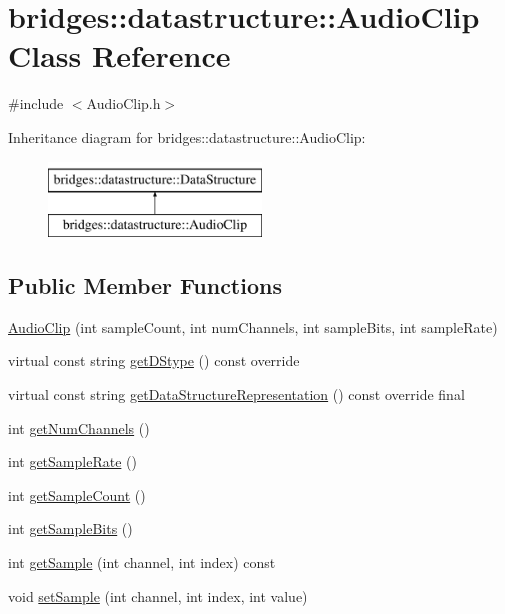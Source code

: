 \hypertarget{classbridges_1_1datastructure_1_1_audio_clip}{}\section{bridges\+:\+:datastructure\+:\+:Audio\+Clip Class Reference}
\label{classbridges_1_1datastructure_1_1_audio_clip}


{\ttfamily \#include $<$Audio\+Clip.\+h$>$}

Inheritance diagram for bridges\+:\+:datastructure\+:\+:Audio\+Clip\+:\begin{figure}[H]
\begin{center}
\leavevmode
\includegraphics[height=2.000000cm]{classbridges_1_1datastructure_1_1_audio_clip}
\end{center}
\end{figure}
\subsection*{Public Member Functions}
\begin{DoxyCompactItemize}
\item 
\hyperlink{classbridges_1_1datastructure_1_1_audio_clip_aa4db655f2e904a30742d45408ff6543c}{Audio\+Clip} (int sample\+Count, int num\+Channels, int sample\+Bits, int sample\+Rate)
\item 
virtual const string \hyperlink{classbridges_1_1datastructure_1_1_audio_clip_a1fc853180a8d825b2e5ea2d8e3f8e810}{get\+D\+Stype} () const override
\item 
virtual const string \hyperlink{classbridges_1_1datastructure_1_1_audio_clip_a9ff485d7b2e0211d9e5c1432d47be617}{get\+Data\+Structure\+Representation} () const override final
\item 
int \hyperlink{classbridges_1_1datastructure_1_1_audio_clip_a8d685e4e2019e9167d55fc4df3d622d7}{get\+Num\+Channels} ()
\item 
int \hyperlink{classbridges_1_1datastructure_1_1_audio_clip_a1c2df0757e09361c56373debac329a16}{get\+Sample\+Rate} ()
\item 
int \hyperlink{classbridges_1_1datastructure_1_1_audio_clip_a1863f03ae6d0c512c49002108ea78a5d}{get\+Sample\+Count} ()
\item 
int \hyperlink{classbridges_1_1datastructure_1_1_audio_clip_ad8b0a62990aadde10174f077ef0a3441}{get\+Sample\+Bits} ()
\item 
int \hyperlink{classbridges_1_1datastructure_1_1_audio_clip_a2a7fe6f7184a90c5ce781889b3c81307}{get\+Sample} (int channel, int index) const
\item 
void \hyperlink{classbridges_1_1datastructure_1_1_audio_clip_a9f275b8d7cb0a2cf00ec7f8b08e58e8c}{set\+Sample} (int channel, int index, int value)
\end{DoxyCompactItemize}



